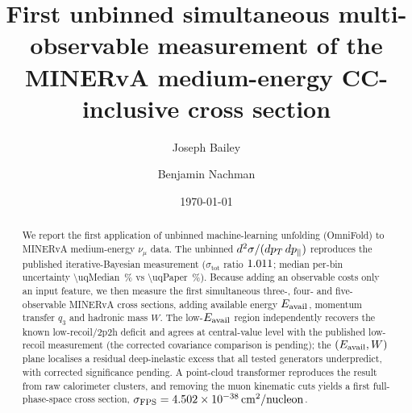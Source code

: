 \documentclass[11pt]{article}
\title{First unbinned simultaneous multi-observable measurement of the
MINERvA medium-energy CC-inclusive cross section}
\author{Joseph Bailey \and Benjamin Nachman}
\date{\today}
\begin{document}
\maketitle

\begin{abstract}
We report the first application of unbinned machine-learning unfolding
(OmniFold) to MINERvA medium-energy $\nu_\mu$ data. The unbinned
$d^{2}\sigma/(dp_{T}\,dp_{\parallel})$ reproduces the published iterative-Bayesian
measurement ($\sigma_{\mathrm{tot}}$ ratio $1.011$; median per-bin
uncertainty \SI{\uqMedian}{\percent} vs \SI{\uqPaper}{\percent}). Because adding
an observable costs only an input feature, we then measure the first
simultaneous three-, four- and five-observable MINERvA cross sections, adding
available energy $E_{\mathrm{avail}}$, momentum transfer $q_{3}$ and hadronic mass $W$. The
low-$E_{\mathrm{avail}}$ region independently recovers the known low-recoil/2p2h deficit
and agrees at central-value level with the published low-recoil measurement
(the corrected covariance comparison is pending); the $(E_{\mathrm{avail}},W)$ plane
localises a residual deep-inelastic excess that all tested generators
underpredict, with corrected significance pending. A point-cloud
transformer reproduces the result from raw calorimeter clusters, and removing
the muon kinematic cuts yields a first full-phase-space cross section,
$\sigma_{\mathrm{FPS}}=\SI{4.502e-38}{cm^2/nucleon}$.
\end{abstract}



\printbibliography
\end{document}
